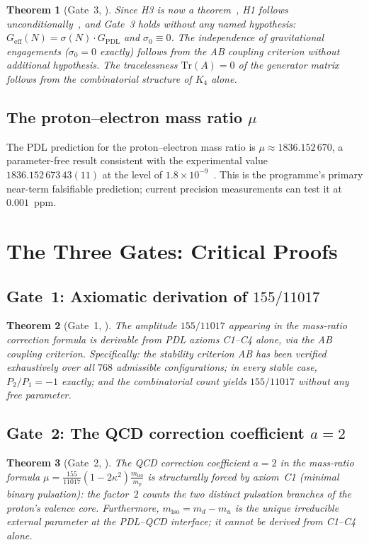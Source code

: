 \documentclass[11pt,a4paper]{article}
\theoremstyle{plain}
\newtheorem{theorem}{Theorem}[section]
\theoremstyle{definition}
\theoremstyle{remark}
\newcommand{\Geff}{G_{\mathrm{eff}}}
\newcommand{\GPDL}{G_{\mathrm{PDL}}}
\newcommand{\sigmaN}{\sigma(N)}
\begin{document}
\begin{theorem}[Gate~3, \cite{D36}]
\label{thm:Gate3}
Since H3 is now a theorem~\cite{D42}, H1 follows unconditionally~\cite{D39}, and Gate~3 holds without any named hypothesis: $\Geff(N)=\sigmaN\cdot\GPDL$ and $\sigma_0\equiv 0$. The independence of gravitational engagements ($\sigma_0=0$ exactly) follows from the AB coupling criterion without additional hypothesis. The tracelessness $\mathrm{Tr}(A)=0$ of the generator matrix follows from the combinatorial structure of $K_4$ alone.
\end{theorem}

\subsection{The proton--electron mass ratio \texorpdfstring{$\mu$}{mu}}
\label{subsec:mu}
The PDL prediction for the proton--electron mass ratio is $\mu\approx 1836.152\,670$, a parameter-free result consistent with the experimental value $1836.152\,673\,43(11)$ at the level of $1.8\times10^{-9}$~\cite{D28,D29,D30}. This is the programme's primary near-term falsifiable prediction; current precision measurements can test it at $0.001$~ppm.

\section{The Three Gates: Critical Proofs}
\label{sec:gates}

\subsection{Gate~1: Axiomatic derivation of \texorpdfstring{$155/11017$}{155/11017}}
\label{subsec:gate1}
\begin{theorem}[Gate~1, \cite{D29}]
\label{thm:Gate1}
The amplitude $155/11017$ appearing in the mass-ratio correction formula is derivable from PDL axioms C1--C4 alone, via the AB coupling criterion. Specifically: the stability criterion AB has been verified exhaustively over all $768$ admissible configurations; in every stable case, $P_2/P_1=-1$ exactly; and the combinatorial count yields $155/11017$ without any free parameter.
\end{theorem}

\subsection{Gate~2: The QCD correction coefficient \texorpdfstring{$a=2$}{a=2}}
\label{subsec:gate2}
\begin{theorem}[Gate~2, \cite{D30}]
\label{thm:Gate2}
The QCD correction coefficient $a=2$ in the mass-ratio formula $\mu=\frac{155}{11017}(1-2\kappa^2)\frac{m_{\mathrm{iso}}}{m_p}$ is structurally forced by axiom~C1 (minimal binary pulsation): the factor~$2$ counts the two distinct pulsation branches of the proton's valence core. Furthermore, $m_{\mathrm{iso}}=m_d-m_u$ is the unique irreducible external parameter at the PDL--QCD interface; it cannot be derived from C1--C4 alone.
\end{theorem}
\end{document}
